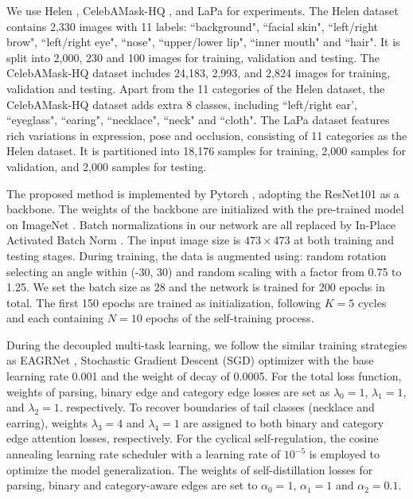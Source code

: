 \documentclass[10pt,twocolumn,letterpaper]{article}
\begin{document}
We use Helen \cite{helen}, CelebAMask-HQ \cite{CelebAMask-HQ}, and LaPa \cite{lapa} for experiments. The Helen dataset contains 2,330 images with 11 labels: ``background", ``facial skin", ``left/right brow", ``left/right eye", ``nose", ``upper/lower lip", ``inner mouth" and ``hair". It is split into 2,000, 230 and 100 images for training, validation and testing. The CelebAMask-HQ dataset includes 24,183, 2,993, and 2,824  images for training, validation and testing. Apart from the 11 categories of the Helen dataset, the CelebAMask-HQ dataset adds extra 8 classes, including ``left/right ear', ``eyeglass", ``earing", ``necklace", ``neck" and ``cloth". The LaPa dataset features rich variations in expression, pose and occlusion, consisting of 11 categories as the Helen dataset. It is partitioned into 18,176 samples for training, 2,000 samples for validation, and 2,000 samples for testing.


The proposed method is implemented by Pytorch \cite{pytorch}, adopting the ResNet101 \cite{resnet101} as a backbone. The weights of the backbone are initialized with the pre-trained model on ImageNet \cite{imagenet}. Batch normalizations in our network are all replaced by In-Place Activated Batch Norm \cite{inplace}. The input image size is $473\times473$ at both training and testing stages. During training, the data is augmented using: random rotation selecting an angle within (-30\textdegree, 30\textdegree) and random scaling with a factor from 0.75 to 1.25. We set the batch size as 28 and the network is trained for 200 epochs in total. The first 150 epochs are trained as initialization, following $K=5$ cycles and each containing $N=10$ epochs of the self-training process. 

During the decoupled multi-task learning, we follow the similar training strategies as EAGRNet \cite{te2020edge}, \ie Stochastic Gradient Descent (SGD) optimizer with the base learning rate 0.001 and the weight of decay of 0.0005. For the total loss function, weights of parsing, binary edge and category edge losses are set as $\lambda_{0} = 1$, $\lambda_{1} = 1$, and $\lambda_{2} = 1$. respectively. To recover boundaries of tail classes (\eg necklace and earring), weights $\lambda_{3} = 4$ and $\lambda_{4} = 1$ are assigned to both binary and category edge attention losses, respectively. For the cyclical self-regulation, the cosine annealing learning rate scheduler \cite{li2020self} with a learning rate of $10^{-5}$ is employed to optimize the model generalization. The weights of self-distillation losses for parsing, binary and category-aware edges are set to $\alpha_{0} = 1$, $\alpha_{1} = 1$ and $\alpha_{2} = 0.1$. 
\end{document}
